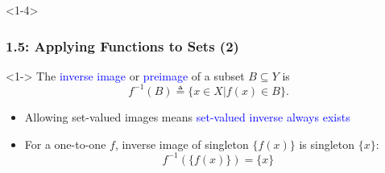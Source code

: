 \documentclass[10pt,english,aspectratio=169,handout]{beamer}
\begin{document}
\begin{frame}<1-4> \frametitle{1.5: Applying Functions to Sets (2)}

\begin{definition}<1->
The \textcolor{blue}{inverse image} or \textcolor{blue}{preimage} of a subset $B\subseteq Y$ is \vspace{-2mm}
\[ f^{-1}(B) \triangleq \{ x\in X | f(x)\in B\}. \]
\end{definition}

\begin{center}
\end{center}
\vspace{-2.5mm}

\begin{itemize}
  \setlength\itemsep{1.25mm}
  \item<3-> Allowing set-valued images means \textcolor{blue}{set-valued inverse always exists}
  \item<4-> For a one-to-one $f$, inverse image of singleton $\{ f(x) \}$ is singleton $\{ x \}$: \vspace{-0.5mm}
  \[ f^{-1}( \{f(x) \}) = \{x\} \]
\end{itemize}


\end{frame}  
\end{document}
